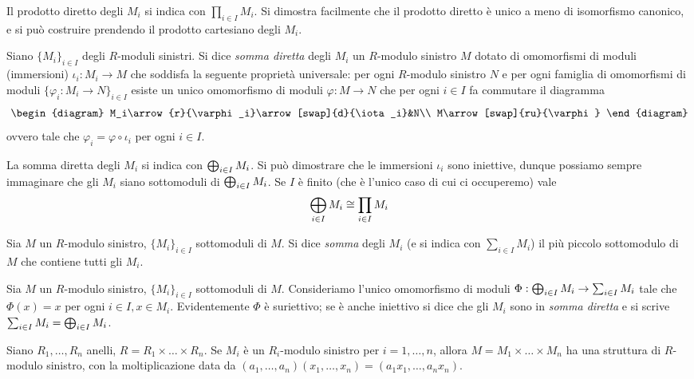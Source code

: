 Il prodotto diretto degli $M_i$ si indica con $\prod_{i\in I}M_i$. Si dimostra facilmente che il prodotto diretto è unico a meno di isomorfismo canonico, e si può costruire prendendo il prodotto cartesiano degli $M_i$.


\begin{definition}
Siano $\{M_i\}_{i\in I}$ degli $R$-moduli sinistri. Si dice \emph{somma diretta} degli $M_i$ un $R$-modulo sinistro $M$ dotato di omomorfismi di moduli (immersioni) $\iota_i:M_i\to M$ che soddisfa la seguente proprietà universale: per ogni $R$-modulo sinistro $N$ e per ogni famiglia di omomorfismi di moduli $\{\varphi_i:M_i\to N\}_{i\in I}$ esiste un unico omomorfismo di moduli $\varphi:M\to N$ che per ogni $i\in I$ fa commutare il diagramma
$$
\begin{diagram}
M_i\arrow{r}{\varphi_i}\arrow[swap]{d}{\iota_i}&N\\
M\arrow[swap]{ru}{\varphi}
\end{diagram}
$$
ovvero tale che $\varphi_i=\varphi\circ\iota_i$ per ogni $i\in I$.
\end{definition}

La somma diretta degli $M_i$ si indica con $\bigoplus_{i\in I}M_i$. Si può dimostrare che le immersioni $\iota_i$ sono iniettive, dunque possiamo sempre immaginare che gli $M_i$ siano sottomoduli di $\bigoplus_{i\in I}M_i$. Se $I$ è finito (che è l'unico caso di cui ci occuperemo) vale
$$
\bigoplus_{i\in I}M_i\cong \prod_{i\in I}M_i
$$


\begin{definition}
Sia $M$ un $R$-modulo sinistro, $\{M_i\}_{i\in I}$ sottomoduli di $M$. Si dice \emph{somma} degli $M_i$ (e si indica con $\sum_{i\in I}M_i$) il più piccolo sottomodulo di $M$ che contiene tutti gli $M_i$.
\end{definition}

\begin{definition}
Sia $M$ un $R$-modulo sinistro, $\{M_i\}_{i\in I}$ sottomoduli di $M$. Consideriamo l'unico omomorfismo di moduli $\Phi:\bigoplus_{i\in I}M_i\to\sum_{i\in I}M_i$ tale che $\Phi(x)=x$ per ogni $i\in I\comma x\in M_i$. Evidentemente $\Phi$ è suriettivo; se è anche iniettivo si dice che gli $M_i$ sono in \emph{somma diretta} e si scrive $\sum_{i\in I}M_i=\bigoplus_{i\in I}M_i$.
\end{definition}


Siano $R_1,\ldots,R_n$ anelli, $R=R_1\times\ldots\times R_n$. Se $M_i$ è un $R_i$-modulo sinistro per $i=1,\ldots,n$, allora $M=M_1\times\ldots\times M_n$ ha una struttura di $R$-modulo sinistro, con la moltiplicazione data da $(a_1,\ldots,a_n)(x_1,\ldots,x_n)=(a_1x_1,\ldots,a_nx_n)$.


